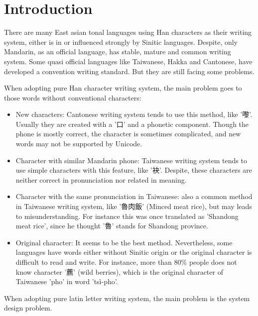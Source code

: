 \section*{Introduction}

There are many East asian tonal languages using Han characters as their writing system, either is in or influenced strongly by Sinitic languages. Despite, only Mandarin, as an official language, has stable, mature and common writing system. Some quasi official languages like Taiwanese, Hakka and Cantonese, have developed a convention writing standard. But they are still facing some problems. \par
When adopting pure Han character writing system, the main problem goes to those words without conventional characters: \par
\begin{itemize}
	\item New characters: Cantonese writing system tends to use this method, like '嚟'. Usually they are created with a '口' and a phonetic component. Though the phone is mostly correct, the character is sometimes complicated, and new words may not be supported by Unicode.  
	\item Character with similar Mandarin phone: Taiwanese writing system tends to use simple characters with this feature, like '袂'. Despite, these characters are neither correct in pronunciation nor related in meaning. 
	\item Character with the same pronunciation in Taiwanese: also a common method in Taiwanese writing system, like '魯肉飯' (Minced meat rice), but may leads to misunderstanding. For instance this was once translated as 'Shandong meat rice', since he thought '魯' stands for Shandong province. 
	\item Original character: It seems to be the best method. Nevertheless, some languages have words either without Sinitic origin or the original character is difficult to read and write. For instance, more than 80\% people does not know character '藨' (wild berries), which is the original character of Taiwanese 'pho' in word 'tsì-pho'. 
\end{itemize}
When adopting pure latin letter writing system, the main problem is the system design problem. \par
